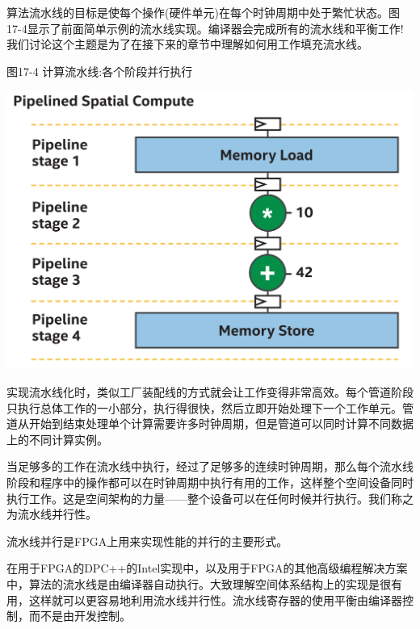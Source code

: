 算法流水线的目标是使每个操作(硬件单元)在每个时钟周期中处于繁忙状态。图17-4显示了前面简单示例的流水线实现。编译器会完成所有的流水线和平衡工作!我们讨论这个主题是为了在接下来的章节中理解如何用工作填充流水线。\par

\hspace*{\fill} \par %
图17-4 计算流水线:各个阶段并行执行
\begin{center}
	\includegraphics[width=1.0\textwidth]{content/chapter-17/images/5}
\end{center}

实现流水线化时，类似工厂装配线的方式就会让工作变得非常高效。每个管道阶段只执行总体工作的一小部分，执行得很快，然后立即开始处理下一个工作单元。管道从开始到结束处理单个计算需要许多时钟周期，但是管道可以同时计算不同数据上的不同计算实例。\par

当足够多的工作在流水线中执行，经过了足够多的连续时钟周期，那么每个流水线阶段和程序中的操作都可以在时钟周期中执行有用的工作，这样整个空间设备同时执行工作。这是空间架构的力量——整个设备可以在任何时候并行执行。我们称之为流水线并行性。\par

\begin{tcolorbox}[colback=red!5!white,colframe=red!75!black]
流水线并行是FPGA上用来实现性能的并行的主要形式。
\end{tcolorbox}

\begin{tcolorbox}[colback=blue!5!white,colframe=blue!75!black, title=自动型流水线]
在用于FPGA的DPC++的Intel实现中，以及用于FPGA的其他高级编程解决方案中，算法的流水线是由编译器自动执行。大致理解空间体系结构上的实现是很有用，这样就可以更容易地利用流水线并行性。流水线寄存器的使用平衡由编译器控制，而不是由开发控制。
\end{tcolorbox}

